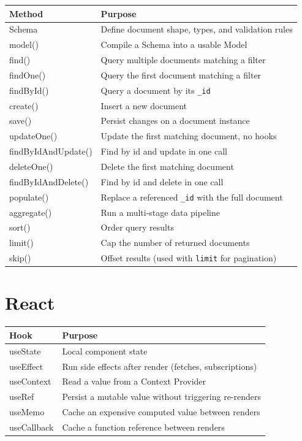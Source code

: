 \begin{tabularx}{\textwidth}{@{}>{\ttfamily}p{4cm}X@{}}
\toprule
Method & Purpose \\
\midrule
Schema & Define document shape, types, and validation rules \\
model() & Compile a Schema into a usable Model \\
find() & Query multiple documents matching a filter \\
findOne() & Query the first document matching a filter \\
findById() & Query a document by its \texttt{\_id} \\
create() & Insert a new document \\
save() & Persist changes on a document instance \\
updateOne() & Update the first matching document, no hooks \\
findByIdAndUpdate() & Find by id and update in one call \\
deleteOne() & Delete the first matching document \\
findByIdAndDelete() & Find by id and delete in one call \\
populate() & Replace a referenced \texttt{\_id} with the full document \\
aggregate() & Run a multi-stage data pipeline \\
sort() & Order query results \\
limit() & Cap the number of returned documents \\
skip() & Offset results (used with \texttt{limit} for pagination) \\
\bottomrule
\end{tabularx}

\section{React}

\begin{tabularx}{\textwidth}{@{}>{\ttfamily}p{4cm}X@{}}
\toprule
Hook & Purpose \\
\midrule
useState & Local component state \\
useEffect & Run side effects after render (fetches, subscriptions) \\
useContext & Read a value from a Context Provider \\
useRef & Persist a mutable value without triggering re-renders \\
useMemo & Cache an expensive computed value between renders \\
useCallback & Cache a function reference between renders \\
\bottomrule
\end{tabularx}

